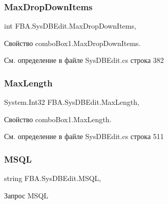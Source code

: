 \subsubsection{\texorpdfstring{Max\+Drop\+Down\+Items}{MaxDropDownItems}}
{\footnotesize\ttfamily int F\+B\+A.\+Sys\+D\+B\+Edit.\+Max\+Drop\+Down\+Items\hspace{0.3cm}{\ttfamily [get]}, {\ttfamily [set]}}



Свойство combo\+Box1.\+Max\+Drop\+Down\+Items. 



См. определение в файле Sys\+D\+B\+Edit.\+cs строка 382

\mbox{\label{class_f_b_a_1_1_sys_d_b_edit_af9f9d6c06b3aaf62ed388016db3c7853}} 
\subsubsection{\texorpdfstring{Max\+Length}{MaxLength}}
{\footnotesize\ttfamily System.\+Int32 F\+B\+A.\+Sys\+D\+B\+Edit.\+Max\+Length\hspace{0.3cm}{\ttfamily [get]}, {\ttfamily [set]}}



Свойство combo\+Box1.\+Max\+Length. 



См. определение в файле Sys\+D\+B\+Edit.\+cs строка 511

\mbox{\label{class_f_b_a_1_1_sys_d_b_edit_aa06663e1062ce9cafbd46081b97cc4a3}} 
\subsubsection{\texorpdfstring{M\+S\+QL}{MSQL}}
{\footnotesize\ttfamily string F\+B\+A.\+Sys\+D\+B\+Edit.\+M\+S\+QL\hspace{0.3cm}{\ttfamily [get]}, {\ttfamily [set]}}



Запрос M\+S\+QL 



